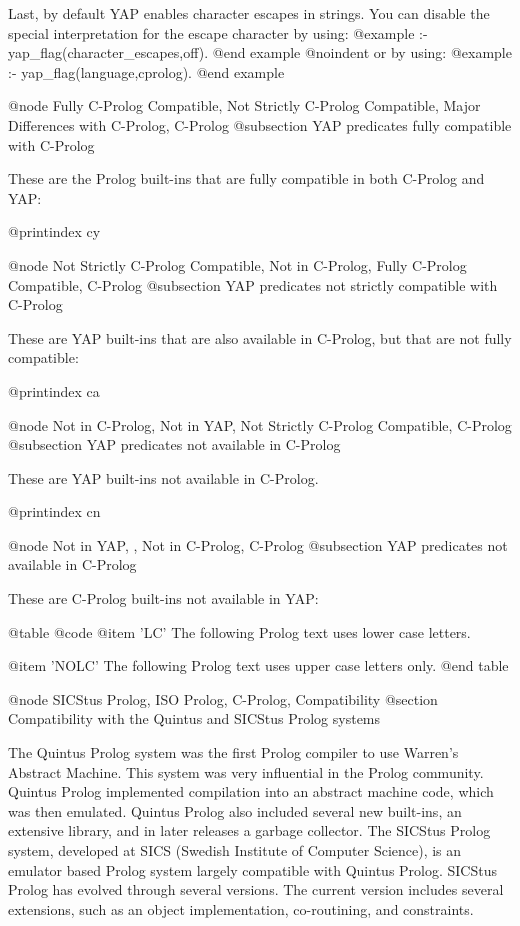 Last, by default YAP enables character escapes in strings. You can
disable the special interpretation for the escape character by using:
@example
:- yap_flag(character_escapes,off).
@end example
@noindent
or by using:
@example
:- yap_flag(language,cprolog).
@end example

@node Fully C-Prolog Compatible, Not Strictly C-Prolog Compatible, Major Differences with C-Prolog, C-Prolog
@subsection YAP predicates fully compatible with C-Prolog

These are the Prolog built-ins that are fully compatible in both
C-Prolog and YAP:

@printindex cy

@node Not Strictly C-Prolog Compatible, Not in C-Prolog, Fully C-Prolog Compatible, C-Prolog
@subsection YAP predicates not strictly compatible with C-Prolog

These are YAP built-ins that are also available in C-Prolog, but
that are not fully compatible:

@printindex ca

@node Not in C-Prolog, Not in YAP, Not Strictly C-Prolog Compatible, C-Prolog
@subsection YAP predicates not available in C-Prolog

These are YAP built-ins not available in C-Prolog.

@printindex cn

@node Not in YAP, , Not in C-Prolog, C-Prolog
@subsection YAP predicates not available in C-Prolog

These are C-Prolog built-ins not available in YAP:

@table @code
@item 'LC'
The following Prolog text uses lower case letters.

@item 'NOLC'
The following Prolog text uses upper case letters only.
@end table

@node SICStus Prolog, ISO Prolog, C-Prolog, Compatibility
@section Compatibility with the Quintus and SICStus Prolog systems

The Quintus Prolog system was the first Prolog compiler to use Warren's
Abstract Machine. This system was very influential in the Prolog
community. Quintus Prolog implemented compilation into an abstract
machine code, which was then emulated. Quintus Prolog also included
several new built-ins, an extensive library, and in later releases a
garbage collector. The SICStus Prolog system, developed at SICS (Swedish
Institute of Computer Science), is an emulator based Prolog system
largely compatible with Quintus Prolog. SICStus Prolog has evolved
through several versions. The current version includes several
extensions, such as an object implementation, co-routining, and
constraints.

